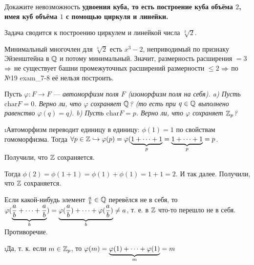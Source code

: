 \begin{problem}[39 (9.12а)]
Докажите невозможность \bf{удвоения куба}, то есть построение куба объёма $2$, имея куб объёма $1$ с помощью циркуля и линейки.
\end{problem}

\begin{solution}
Задача сводится к построению циркулем и линейкой числа \(\sqrt[3]{2}\).

Минимальный многочлен для $\sqrt[3]{2}$ есть $x^3 - 2$, неприводимый по признаку Эйзенштейна в $\mathbb{Q}$ и потому минимальный.
Значит, размерность расширения $= 3$ $\Rightarrow$ не существует башни промежуточных расширений размерности $\le 2$ $\Rightarrow$ по №19 exam\_7-8 её нельзя построить.

\end{solution}

\begin{problem}[40 (10.2)]
Пусть $\varphi: F \to F$ --- \it{автоморфизм поля} $F$ (изоморфизм поля на себя). 
a) Пусть $\mathrm{char} F =0$. Верно ли, что $\varphi$ сохраняет $\mathbb{Q}$? (то есть при $q\in\mathbb{Q}$ выполнено равенство $\varphi(q)=q$).
b) Пусть $\mathrm{char} F =p$. Верно ли, что $\varphi$ сохраняет $\mathbb{Z}_p$?
\end{problem}

\begin{solution}
\begin{enumerate}
\def\labelenumi{\alph{enumi})}
\i Автоморфизм переводит единицу в единицу: \(\phi(1) = 1\) по свойствам гомоморфизма.
Тогда \(\forall p \in \mathbb{Z} \hookrightarrow \varphi(p) = \varphi(\underbrace{1+\dots+1}_{p} = \underbrace{1+\dots+1}_{p} = p\). Получили, что \(\mathbb{Z}\) сохраняется.

Тогда $\phi(2) = \phi(1+1) = \phi(1)+\phi(1)=1+1=2$.
И так далее. Получили, что $\mathbb{Z}$ сохраняется.

Если какой-нибудь элемент $\frac{a}{b} \in \mathbb{Q}$ перевёлся не в себя, то $\varphi(\underbrace{\frac{a}{b}+\dots+\frac{a}{b}}_{b}) = \underbrace{\varphi(\frac{a}{b})+\dots+\varphi(\frac{a}{b})}_{b} \ne a$, т. е. в $\mathbb{Z}$ что-то перешло не в себя. Противоречие.
%

\i Да, т. к. если \(m \in \mathbb{Z}_p\), то \(\varphi(m) = \underbrace{\varphi(1)+\dots+\varphi(1)}_{m} = m\)
\end{enumerate}
\end{solution}

